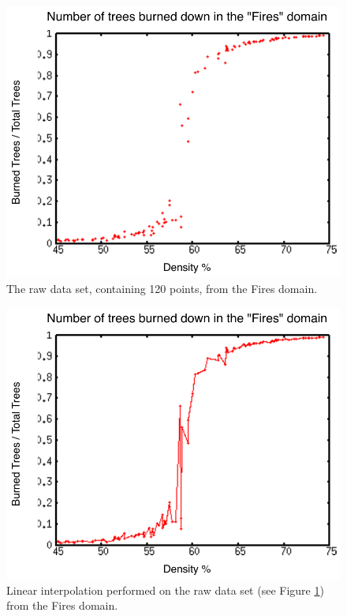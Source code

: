 \begin{figure}[ht]
\centering
\includegraphics[scale=.66666667]{images/rii0.pdf}
\caption{The raw data set, containing 120 points, from the Fires domain.}
\label{fig:rii0}
\end{figure}

\begin{figure}[ht]
\centering
\includegraphics[scale=.66666667]{images/rii1.pdf}
\caption{Linear interpolation performed on the raw data set (see Figure \ref{fig:rii0}) from the Fires domain.}
\label{fig:rii1}
\end{figure}

